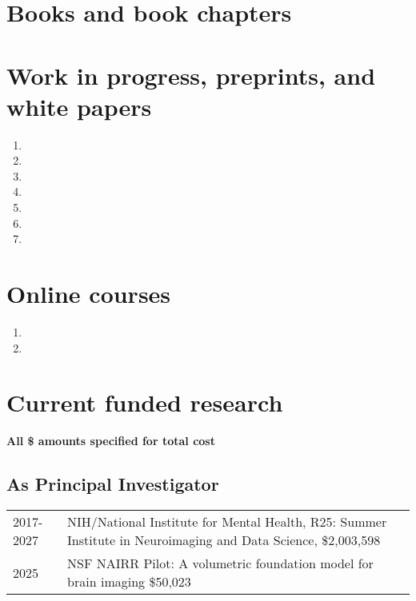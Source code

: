 \documentclass[11pt,fullpage]{article}
\begin{document}
\section*{Books and book chapters}
  \begin{etaremune}
\item {}
\item {}
\item {}
\item {}
  \end{etaremune}

\section*{Work in progress, preprints, and white papers}
\begin{enumerate}
  \item {}
  \item {}
  \item {}
  \item {}
  \item {}
  \item {}
  \item {}
\end{enumerate}

\section*{Online courses}
\begin{enumerate}
  \item {}
  \item {}
\end{enumerate}

\newpage

\section*{Current funded research}

\textbf{All \$ amounts specified for total cost}

\subsection*{As Principal Investigator}
\begin{tabular}{p{}p{}}
2017-2027 & NIH/National Institute for Mental Health, R25: Summer Institute in Neuroimaging and Data Science, \$2,003,598\\
2025 & NSF NAIRR Pilot: A volumetric foundation model for brain imaging \$50,023 \\
\end{tabular}
\end{document}
